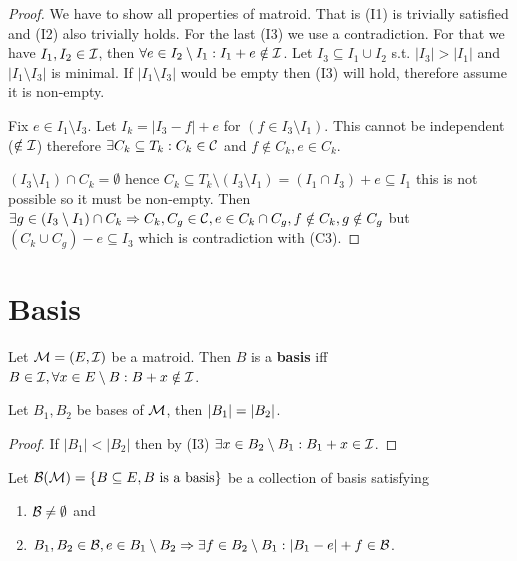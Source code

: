 \begin{proof}
	We have to show all properties of matroid. That is (I1) is trivially satisfied and (I2) also trivially holds. For the last (I3) we use a contradiction. For that we have $I_1, I_2 \in \mathcal{I}$, then $\forall e \in I_2 \setminus I_1 : I_1 + e \notin \mathcal{I}$. Let $I_3 \subseteq I_1 \cup I_2$ s.t. $|I_3| > |I_1|$ and $|I_1 \setminus I_3|$ is minimal. If $|I_1 \setminus I_3|$ would be empty then (I3) will hold, therefore assume it is non-empty.
	
	Fix $e \in I_1 \setminus I_3$. Let $I_k = |I_3 - f| +e$ for $(f \in I_3 \setminus I_1)$. This cannot be independent ($\notin \mathcal{I}$) therefore $\exists C_k \subseteq T_k : C_k \in \mathcal{C}$ and $f \notin C_k, e \in C_k$.
	
	$(I_3 \setminus I_1) \cap C_k = \emptyset$ hence $C_k \subseteq T_k \setminus (I_3 \setminus I_1) = (I_1 \cap I_3) + e \subseteq I_1$ this is not possible so it must be non-empty. Then $\exists g \in (I_3 \setminus I_1) \cap C_k \Rightarrow C_k, C_g \in \mathcal{C}, e \in C_k \cap C_g, f \notin C_k, g \notin C_g$ but $(C_k \cup C_g) - e \subseteq I_3$ which is contradiction with (C3).
\end{proof}

\section{Basis}

\begin{defn}
	Let $\mathcal{M} = (E, \mathcal{I})$ be a matroid. Then $B$ is a \textbf{basis} iff $B \in \mathcal{I}, \forall x \in E \setminus B: B + x \notin \mathcal{I}$.
\end{defn}

\begin{prop}
	Let $B_1, B_2$ be bases of $\mathcal{M}$, then $\left|{B_1}\right| = \left|{B_2}\right|$.
\end{prop}

\begin{proof}
	If $|B_1| < |B_2|$ then by (I3) $\exists x \in B_2 \setminus B_1 : B_1 + x \in \mathcal{I}$.
\end{proof}

\begin{defn}
	Let $\mathcal{B} (\mathcal{M}) = \{B \subseteq E , B \text{ is a basis}\}$ be a collection of basis satisfying
	
	\begin{enumerate}[(B1)]
		\item $\mathcal{B} \neq \emptyset$ and
		\item $B_1, B_2 \in \mathcal{B}, e \in B_1 \setminus B_2 \Rightarrow \exists f \in B_2 \setminus B_1 : |B_1 - e| + f \in \mathcal{B}$.
	\end{enumerate}
\end{defn}

